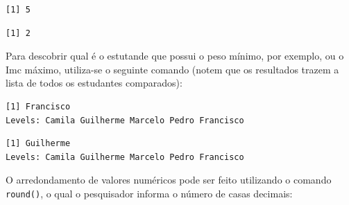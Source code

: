 \documentclass[12pt,brazil,oneside]{book}
\newenvironment{Shaded}{\begin{snugshade}}{\end{snugshade}}
\newcommand{\CommentTok}[1]{\textcolor[rgb]{0.56,0.35,0.01}{\textit{#1}}}
\newcommand{\DecValTok}[1]{\textcolor[rgb]{0.00,0.00,0.81}{#1}}
\newcommand{\KeywordTok}[1]{\textcolor[rgb]{0.13,0.29,0.53}{\textbf{#1}}}
\newcommand{\NormalTok}[1]{#1}
\newcommand{\OperatorTok}[1]{\textcolor[rgb]{0.81,0.36,0.00}{\textbf{#1}}}
\begin{document}
\begin{verbatim}
[1] 5
\end{verbatim}

\begin{Shaded}
\end{Shaded}

\begin{verbatim}
[1] 2
\end{verbatim}

Para descobrir qual é o estutande que possui o peso mínimo, por exemplo,
ou o Imc máximo, utiliza-se o seguinte comando (notem que os resultados
trazem a lista de todos os estudantes comparados):

\begin{Shaded}
\end{Shaded}

\begin{verbatim}
[1] Francisco
Levels: Camila Guilherme Marcelo Pedro Francisco
\end{verbatim}

\begin{Shaded}
\end{Shaded}

\begin{verbatim}
[1] Guilherme
Levels: Camila Guilherme Marcelo Pedro Francisco
\end{verbatim}

O arredondamento de valores numéricos pode ser feito utilizando o
comando \texttt{round()}, o qual o pesquisador informa o número de casas
decimais:

\begin{Shaded}
\end{Shaded}
\end{document}
